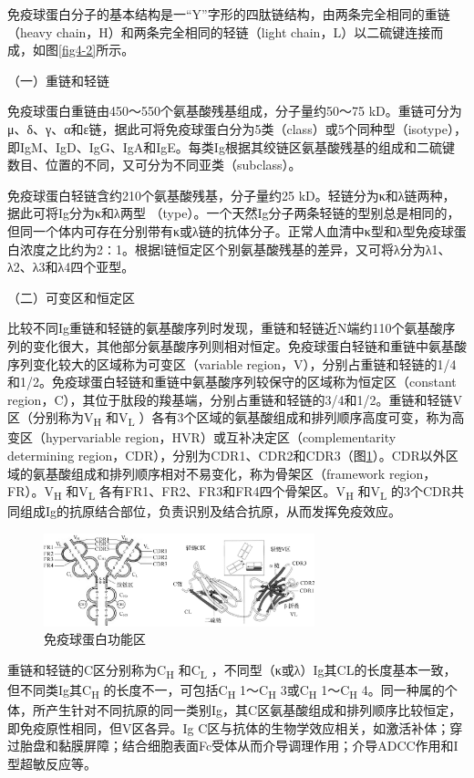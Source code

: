 免疫球蛋白分子的基本结构是一“Y”字形的四肽链结构，由两条完全相同的重链（heavy
chain，H）和两条完全相同的轻链（light
chain，L）以二硫键连接而成，如图\ref{fig4-2}所示。

（一）重链和轻链

免疫球蛋白重链由450～550个氨基酸残基组成，分子量约50～75
kD。重链可分为μ、δ、γ、α和ε链，据此可将免疫球蛋白分为5类（class）或5个同种型（isotype），即IgM、IgD、IgG、IgA和IgE。每类Ig根据其绞链区氨基酸残基的组成和二硫键数目、位置的不同，又可分为不同亚类（subclass）。

免疫球蛋白轻链含约210个氨基酸残基，分子量约25
kD。轻链分为κ和λ链两种，据此可将Ig分为κ和λ两型
（type）。一个天然Ig分子两条轻链的型别总是相同的，但同一个体内可存在分别带有κ或λ链的抗体分子。正常人血清中κ型和λ型免疫球蛋白浓度之比约为2∶1。根据l链恒定区个别氨基酸残基的差异，又可将λ分为λ1、λ2、λ3和λ4四个亚型。

（二）可变区和恒定区

比较不同Ig重链和轻链的氨基酸序列时发现，重链和轻链近N端约110个氨基酸序列的变化很大，其他部分氨基酸序列则相对恒定。免疫球蛋白轻链和重链中氨基酸序列变化较大的区域称为可变区（variable
region，V），分别占重链和轻链的1/4和1/2。免疫球蛋白轻链和重链中氨基酸序列较保守的区域称为恒定区（constant
region，C），其位于肽段的羧基端，分别占重链和轻链的3/4和1/2。重链和轻链V区（分别称为V\textsubscript{H}
和V\textsubscript{L}
）各有3个区域的氨基酸组成和排列顺序高度可变，称为高变区（hypervariable
region，HVR）或互补决定区（complementarity determining
region，CDR），分别为CDR1、CDR2和CDR3（图\ref{fig4-3}）。CDR以外区域的氨基酸组成和排列顺序相对不易变化，称为骨架区（framework
region，FR）。V\textsubscript{H} 和V\textsubscript{L}
各有FR1、FR2、FR3和FR4四个骨架区。V\textsubscript{H}
和V\textsubscript{L}
的3个CDR共同组成Ig的抗原结合部位，负责识别及结合抗原，从而发挥免疫效应。

\begin{figure}[!htbp]
 \centering
 \includegraphics[width=0.7\textwidth]{./images/Image00063.jpg}
 \captionsetup{justification=centering}
 \caption{免疫球蛋白功能区}
 \label{fig4-3}
  \end{figure} 

重链和轻链的C区分别称为C\textsubscript{H} 和C\textsubscript{L}
，不同型（κ或λ）Ig其CL的长度基本一致，但不同类Ig其C\textsubscript{H}
的长度不一，可包括C\textsubscript{H} 1～C\textsubscript{H}
3或C\textsubscript{H} 1～C\textsubscript{H}
4。同一种属的个体，所产生针对不同抗原的同一类别Ig，其C区氨基酸组成和排列顺序比较恒定，即免疫原性相同，但V区各异。Ig
C区与抗体的生物学效应相关，如激活补体；穿过胎盘和黏膜屏障；结合细胞表面Fc受体从而介导调理作用；介导ADCC作用和I型超敏反应等。

